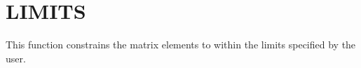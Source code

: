 \section{LIMITS}
\label{sect:limits}

\noindent This function constrains the matrix elements to within the limits
specified by the user.\\
